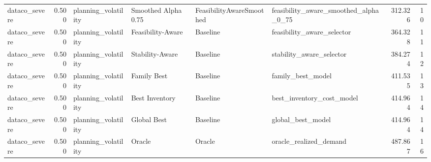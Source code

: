 \begin{table}
{\begin{tabular}{lrllllrr}
 dataco\_severe &             0.500 &         planning\_volatility &   Smoothed Alpha 0.75 &  FeasibilityAwareSmoothed &              feasibility\_aware\_smoothed\_alpha\_0\_75 &       312.326 &              10 \\
 dataco\_severe &             0.500 &         planning\_volatility &     Feasibility-Aware &                  Baseline &                         feasibility\_aware\_selector &       364.328 &              11 \\
 dataco\_severe &             0.500 &         planning\_volatility &       Stability-Aware &                  Baseline &                           stability\_aware\_selector &       384.274 &              12 \\
 dataco\_severe &             0.500 &         planning\_volatility &           Family Best &                  Baseline &                                  family\_best\_model &       411.535 &              13 \\
 dataco\_severe &             0.500 &         planning\_volatility &        Best Inventory &                  Baseline &                          best\_inventory\_cost\_model &       414.964 &              14 \\
 dataco\_severe &             0.500 &         planning\_volatility &           Global Best &                  Baseline &                                  global\_best\_model &       414.964 &              14 \\
 dataco\_severe &             0.500 &         planning\_volatility &                Oracle &                    Oracle &                             oracle\_realized\_demand &       487.867 &              16 \\
\bottomrule
\end{tabular}
}

\end{table}
